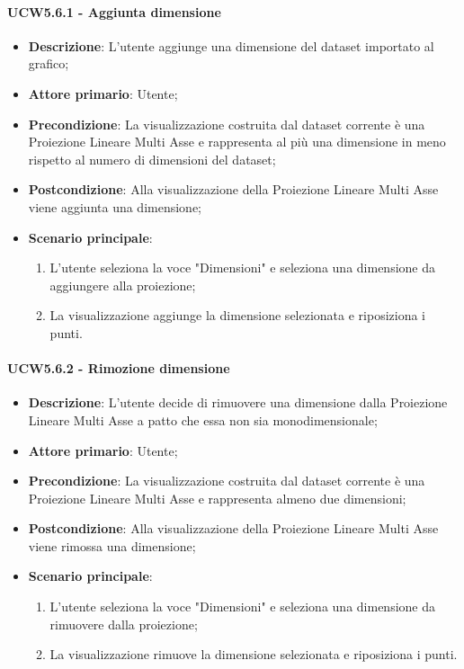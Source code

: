 \paragraph{UCW5.6.1 - Aggiunta dimensione}
\label{par:ucw5.6.1}
\begin{itemize}
    \item \textbf{Descrizione}: L’utente aggiunge una dimensione del dataset importato al grafico;

    \item \textbf{Attore primario}: Utente;

    \item \textbf{Precondizione}:   La visualizzazione costruita dal dataset corrente è una Proiezione Lineare Multi Asse
          e rappresenta al più una dimensione in meno rispetto al numero di dimensioni del dataset;
    \item \textbf{Postcondizione}:  Alla visualizzazione della Proiezione Lineare Multi Asse viene aggiunta una dimensione;

    \item \textbf{Scenario principale}:
          \begin{enumerate}
              \item L'utente seleziona la voce "Dimensioni" e seleziona una dimensione da aggiungere alla proiezione;
              \item La visualizzazione aggiunge la dimensione selezionata e riposiziona i punti.
          \end{enumerate}
\end{itemize}

\paragraph{UCW5.6.2 - Rimozione dimensione}
\label{par:ucw5.6.2}
\begin{itemize}
    \item \textbf{Descrizione}: L’utente decide di rimuovere una dimensione dalla Proiezione Lineare Multi Asse
          a patto che essa non sia monodimensionale;

    \item \textbf{Attore primario}: Utente;

    \item \textbf{Precondizione}:   La visualizzazione costruita dal dataset corrente è una Proiezione Lineare Multi Asse
          e rappresenta almeno due dimensioni;
    \item \textbf{Postcondizione}:  Alla visualizzazione della Proiezione Lineare Multi Asse viene rimossa una dimensione;

    \item \textbf{Scenario principale}:
          \begin{enumerate}
              \item L'utente seleziona la voce "Dimensioni" e seleziona una dimensione da rimuovere dalla proiezione;
              \item La visualizzazione rimuove la dimensione selezionata e riposiziona i punti.
          \end{enumerate}
\end{itemize}

